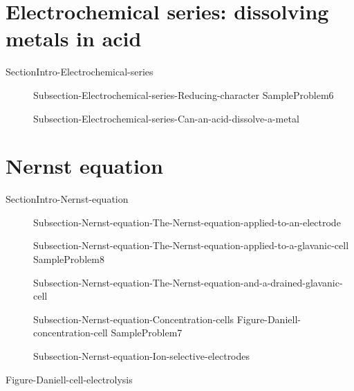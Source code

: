 \documentclass[main.tex]{subfiles}
\newcommand\chapterlabel{Ch-electrochem}\setcounter{figurenewcounter}{0}\setcounter{tablenewcounter}{0}\setcounter{formulanewcounter}{0}\chapterpicture{../{\chapterlabel}/figure1}\chapterpicturelabel{PxFuel}
\begin{document}
\section{Electrochemical series: dissolving metals in acid}{SectionIntro-Electrochemical-series}
\sloppy\begin{description}
   \item[] {Subsection-Electrochemical-series-Reducing-character}
  {SampleProblem6}
\item[] {Subsection-Electrochemical-series-Can-an-acid-dissolve-a-metal}
\end{description}


\section{Nernst equation}{SectionIntro-Nernst-equation}
\sloppy\begin{description}
   \item[] {Subsection-Nernst-equation-The-Nernst-equation-applied-to-an-electrode}
   \item[] {Subsection-Nernst-equation-The-Nernst-equation-applied-to-a-glavanic-cell}
     {SampleProblem8}
   \item[] {Subsection-Nernst-equation-The-Nernst-equation-and-a-drained-glavanic-cell}
   \item[] {Subsection-Nernst-equation-Concentration-cells}
{Figure-Daniell-concentration-cell}
  {SampleProblem7}
   \item[] {Subsection-Nernst-equation-Ion-selective-electrodes}
\end{description}
 {Figure-Daniell-cell-electrolysis}
\end{document}
